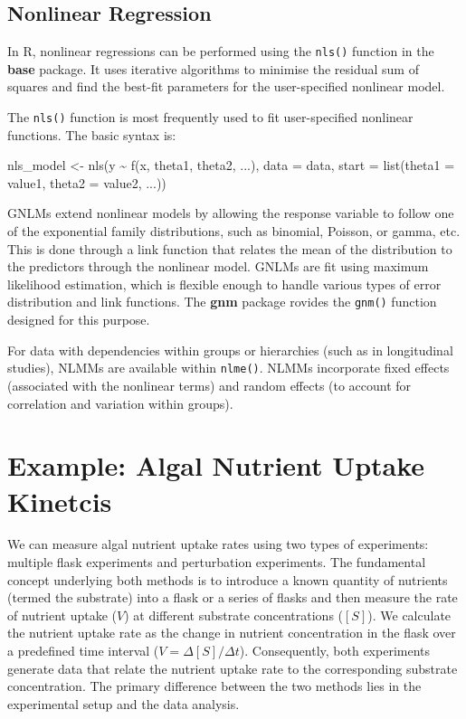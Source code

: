 \documentclass[
  letterpaper,
]{book}
\newenvironment{Shaded}{\begin{snugshade}}{\end{snugshade}}
\newcommand{\AttributeTok}[1]{\textcolor[rgb]{0.40,0.45,0.13}{#1}}
\newcommand{\FunctionTok}[1]{\textcolor[rgb]{0.28,0.35,0.67}{#1}}
\newcommand{\NormalTok}[1]{\textcolor[rgb]{0.00,0.23,0.31}{#1}}
\newcommand{\OtherTok}[1]{\textcolor[rgb]{0.00,0.23,0.31}{#1}}
\newcommand{\SpecialCharTok}[1]{\textcolor[rgb]{0.37,0.37,0.37}{#1}}
\begin{document}
\subsection{Nonlinear Regression}\label{nonlinear-regression}

In R, nonlinear regressions can be performed using the \texttt{nls()}
function in the \textbf{base} package. It uses iterative algorithms to
minimise the residual sum of squares and find the best-fit parameters
for the user-specified nonlinear model.

The \texttt{nls()} function is most frequently used to fit
user-specified nonlinear functions. The basic syntax is:

\begin{Shaded}
\begin{Highlighting}[]
\NormalTok{nls\_model }\OtherTok{\textless{}{-}} \FunctionTok{nls}\NormalTok{(y }\SpecialCharTok{\textasciitilde{}} \FunctionTok{f}\NormalTok{(x, theta1, theta2, ...), }\AttributeTok{data =}\NormalTok{ data,}
                 \AttributeTok{start =} \FunctionTok{list}\NormalTok{(}\AttributeTok{theta1 =}\NormalTok{ value1, }\AttributeTok{theta2 =}\NormalTok{ value2, ...))}
\end{Highlighting}
\end{Shaded}

GNLMs extend nonlinear models by allowing the response variable to
follow one of the exponential family distributions, such as binomial,
Poisson, or gamma, etc. This is done through a link function that
relates the mean of the distribution to the predictors through the
nonlinear model. GNLMs are fit using maximum likelihood estimation,
which is flexible enough to handle various types of error distribution
and link functions. The \textbf{gnm} package rovides the \texttt{gnm()}
function designed for this purpose.

For data with dependencies within groups or hierarchies (such as in
longitudinal studies), NLMMs are available within \texttt{nlme()}. NLMMs
incorporate fixed effects (associated with the nonlinear terms) and
random effects (to account for correlation and variation within groups).

\section{Example: Algal Nutrient Uptake Kinetcis}\label{sec-ex1}

We can measure algal nutrient uptake rates using two types of
experiments: multiple flask experiments and perturbation experiments.
The fundamental concept underlying both methods is to introduce a known
quantity of nutrients (termed the substrate) into a flask or a series of
flasks and then measure the rate of nutrient uptake (\(V\)) at different
substrate concentrations (\([S]\)). We calculate the nutrient uptake
rate as the change in nutrient concentration in the flask over a
predefined time interval (\(V = \Delta [S]/\Delta t\)). Consequently,
both experiments generate data that relate the nutrient uptake rate to
the corresponding substrate concentration. The primary difference
between the two methods lies in the experimental setup and the data
analysis.
\end{document}
